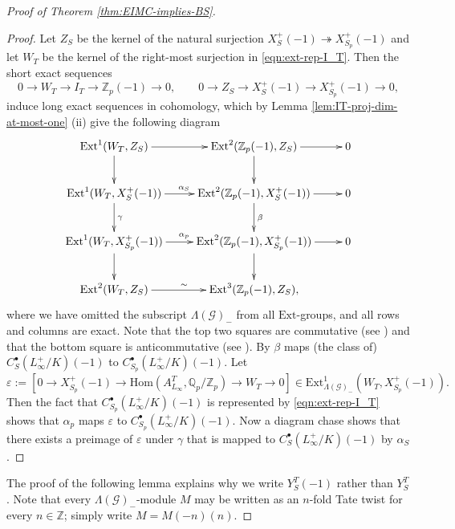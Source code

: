 \documentclass[12pt]{amsart}
\theoremstyle{plain}
\theoremstyle{remark}
\theoremstyle{definition}
\numberwithin{equation}{section}
\begin{document}
{\begin{proof}[Proof of Theorem \ref{thm:EIMC-implies-BS}]
\begin{proof}
Let $Z_{S}$ be the kernel of the natural surjection $X_{S}^{+}(-1) \twoheadrightarrow X_{S_{p}}^{+}(-1)$
and let $W_{T}$ be the kernel of the right-most surjection in \eqref{eqn:ext-rep-I_T}.
Then the short exact sequences
\[
0 \longrightarrow W_{T} \longrightarrow I_{T} \longrightarrow {\mathbb{Z}}_{p}(-1) \longrightarrow 0, \qquad 
0 \longrightarrow Z_{S} \longrightarrow X_{S}^{+}(-1) \longrightarrow X_{S_{p}}^{+}(-1) \longrightarrow 0,
\]
induce long exact sequences in cohomology, which by Lemma \ref{lem:IT-proj-dim-at-most-one} (ii) give the following diagram 
\[
\xymatrix{
{\mathrm{Ext}}^{1}(W_{T},Z_{S}) \ar[r] \ar[d] &
{\mathrm{Ext}}^{2}({\mathbb{Z}}_{p}(-1),Z_{S}) \ar[r] \ar[d] & 0\\
{\mathrm{Ext}}^{1}(W_{T},X_{S}^{+}(-1)) \ar[r]^{\alpha_{S}} \ar[d]^{\gamma} & {\mathrm{Ext}}^{2}({\mathbb{Z}}_{p}(-1),X_{S}^{+}(-1)) \ar[r] \ar[d]^{\beta} & 0\\
{\mathrm{Ext}}^{1}(W_{T},X_{S_{p}}^{+}(-1)) \ar[r]^{\alpha_{p}} \ar[d] & {\mathrm{Ext}}^{2}({\mathbb{Z}}_{p}(-1),X_{S_{p}}^{+}(-1))  \ar[r] \ar[d] & 0\\
{\mathrm{Ext}}^{2}(W_{T},Z_{S}) \ar[r]^{\sim}  & {\mathrm{Ext}}^{3}({\mathbb{Z}}_{p}(-1),Z_{S}), &
}
\]
where we have omitted the subscript $\Lambda(\mathcal{G})_{-}$ from all ${\mathrm{Ext}}$-groups, 
and all rows and columns are exact. 
Note that the top two squares are commutative (see \cite[(7.3), p.\ 140]{MR1438546}) and that the bottom square is anticommutative
(see  \cite[Exercise 9.9, p.\ 156]{MR1438546}). 
By \cite[Lemma 2.4]{MR2371375} $\beta$ maps (the class of) $C_{S}^{\bullet}(L_{\infty}^{+}/K)(-1)$ to 
$C_{S_{p}}^{\bullet}(L_{\infty}^{+}/K)(-1)$.
Let 
\[
\varepsilon := [ 0 \longrightarrow X_{S_{p}}^{+} (-1) \longrightarrow {\mathrm{Hom}}(A_{L_{\infty}}^{T}, {\mathbb{Q}}_{p} / {\mathbb{Z}}_{p}) \longrightarrow
W_{T} \longrightarrow 0] \in {\mathrm{Ext}}_{\Lambda(\mathcal{G})_{-}}^{1}(W_{T},X_{S_{p}}^{+}(-1)).
\]
Then the fact that $C_{S_{p}}^{\bullet}(L_{\infty}^{+}/K)(-1)$ is represented by 
\eqref{eqn:ext-rep-I_T} shows that $\alpha_{p}$ maps $\varepsilon$ to $C_{S_{p}}^{\bullet}(L_{\infty}^{+}/K)(-1)$.
Now a diagram chase shows that there exists a preimage of $\varepsilon$ under $\gamma$ that is mapped to 
$C_{S}^{\bullet}(L_{\infty}^{+}/K)(-1)$ by $\alpha_{S}$.
\end{proof}

The proof of the following lemma explains why we write $Y_{S}^{T} (-1)$ rather than $Y_{S}^{T}$.
Note that every $\Lambda(\mathcal{G})_{-}$-module $M$ may be written as an $n$-fold Tate twist for every $n \in {\mathbb{Z}}$;
simply write $M = M(-n)(n)$.


\end{proof}}
\end{document}
